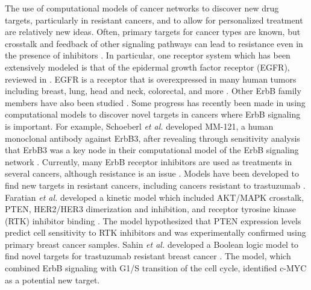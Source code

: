 \documentclass[12pt]{article}
\begin{document}
The use of computational models of cancer networks to discover new drug targets, particularly in resistant cancers, and to allow for personalized treatment are relatively new ideas. Often, primary targets for cancer types are known, but crosstalk and feedback of other signaling pathways can lead to resistance even in the presence of inhibitors \cite{Keith2005}. In particular, one receptor system which has been extensively modeled is that of the epidermal growth factor receptor (EGFR), reviewed in \cite{Wiley2003}. EGFR is a receptor that is overexpressed in many human tumors including breast, lung, head and neck, colorectal, and more \cite{Salomon1995}. Other ErbB family members have also been studied \cite{Yarden2001}. Some progress has recently been made in using computational models to discover novel targets in cancers where ErbB signaling is important. For example, Schoeberl \textit{et al.} developed MM-121, a human monoclonal antibody against ErbB3, after revealing through sensitivity analysis that ErbB3 was a key node in their computational model of the ErbB signaling network \cite{Schoeberl2009}. Currently, many ErbB receptor inhibitors are used as treatments in several cancers, although resistance is an issue \cite{Hynes2005}. Models have been developed to find new targets in resistant cancers, including cancers resistant to trastuzumab \cite{Faratian2009,Sahin2009}. Faratian \textit{et al.} developed a kinetic model which included AKT/MAPK crosstalk, PTEN, HER2/HER3 dimerization and inhibition, and receptor tyrosine kinase (RTK) inhibitor binding \cite{Faratian2009}. The model hypothesized that PTEN expression levels predict cell sensitivity to RTK inhibitors and was experimentally confirmed using primary breast cancer samples. Sahin \textit{et al.} developed a Boolean logic model to find novel targets for trastuzumab resistant breast cancer \cite{Sahin2009}. The model, which combined ErbB signaling with G1/S transition of the cell cycle, identified c-MYC as a potential new target. 
\end{document}
